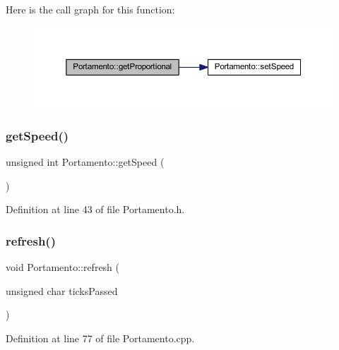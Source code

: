 Here is the call graph for this function\+:
\nopagebreak
\begin{figure}[H]
\begin{center}
\leavevmode
\includegraphics[width=350pt]{class_portamento_a2cc6e550905558daac49cbef693c62fb_cgraph}
\end{center}
\end{figure}
\mbox{\label{class_portamento_a6542d6becc564aaec446ec86104a8c2d}} 
\subsubsection{\texorpdfstring{get\+Speed()}{getSpeed()}}
{\footnotesize\ttfamily unsigned int Portamento\+::get\+Speed (\begin{DoxyParamCaption}{ }\end{DoxyParamCaption})\hspace{0.3cm}{\ttfamily [inline]}}



Definition at line 43 of file Portamento.\+h.

\mbox{\label{class_portamento_a4a5430c4e0561f9b37bbffdcbb936c43}} 
\subsubsection{\texorpdfstring{refresh()}{refresh()}}
{\footnotesize\ttfamily void Portamento\+::refresh (\begin{DoxyParamCaption}\item[{unsigned char}]{ticks\+Passed }\end{DoxyParamCaption})}



Definition at line 77 of file Portamento.\+cpp.

